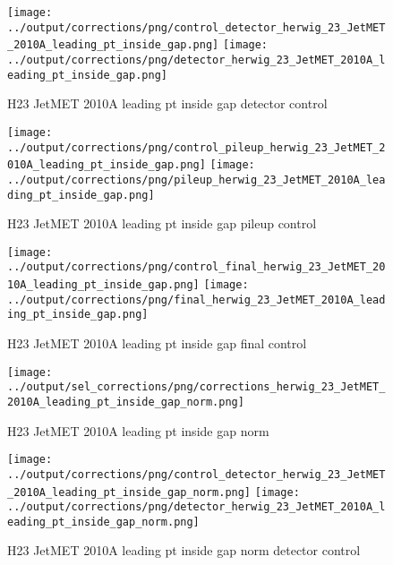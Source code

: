 \documentclass[11pt]{book}
\begin{document}
\begin{figure}[ht]
\centering
\texttt{[image: ../output/corrections/png/control\_detector\_herwig\_23\_JetMET\_2010A\_leading\_pt\_inside\_gap.png]}
\texttt{[image: ../output/corrections/png/detector\_herwig\_23\_JetMET\_2010A\_leading\_pt\_inside\_gap.png]}
\caption{H23 JetMET 2010A leading pt inside gap detector control}
\label{fig:H23_JetMET_2010A_leading_pt_inside_gap_detector_control}
\end{figure}

\begin{figure}[ht]
\centering
\texttt{[image: ../output/corrections/png/control\_pileup\_herwig\_23\_JetMET\_2010A\_leading\_pt\_inside\_gap.png]}
\texttt{[image: ../output/corrections/png/pileup\_herwig\_23\_JetMET\_2010A\_leading\_pt\_inside\_gap.png]}
\caption{H23 JetMET 2010A leading pt inside gap pileup control}
\label{fig:H23_JetMET_2010A_leading_pt_inside_gap_pileup_control}
\end{figure}


\begin{figure}[ht]
\centering
\texttt{[image: ../output/corrections/png/control\_final\_herwig\_23\_JetMET\_2010A\_leading\_pt\_inside\_gap.png]}
\texttt{[image: ../output/corrections/png/final\_herwig\_23\_JetMET\_2010A\_leading\_pt\_inside\_gap.png]}
\caption{H23 JetMET 2010A leading pt inside gap final control}
\label{fig:H23_JetMET_2010A_leading_pt_inside_gap_final_control}
\end{figure}



\begin{figure}[ht]
\centering
\texttt{[image: ../output/sel\_corrections/png/corrections\_herwig\_23\_JetMET\_2010A\_leading\_pt\_inside\_gap\_norm.png]}
\caption{H23 JetMET 2010A leading pt inside gap norm}
\label{fig:H23_JetMET_2010A_leading_pt_inside_gap_norm}
\end{figure}

\begin{figure}[ht]
\centering
\texttt{[image: ../output/corrections/png/control\_detector\_herwig\_23\_JetMET\_2010A\_leading\_pt\_inside\_gap\_norm.png]}
\texttt{[image: ../output/corrections/png/detector\_herwig\_23\_JetMET\_2010A\_leading\_pt\_inside\_gap\_norm.png]}
\caption{H23 JetMET 2010A leading pt inside gap norm detector control}
\label{fig:H23_JetMET_2010A_leading_pt_inside_gap_norm_detector_control}
\end{figure}
\end{document}
